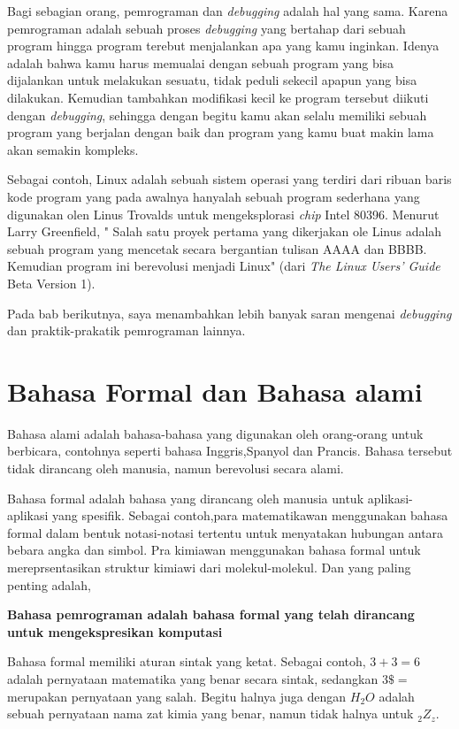 Bagi sebagian orang, pemrograman dan \textit{debugging} adalah hal yang sama. Karena pemrograman adalah sebuah proses \textit{debugging} yang bertahap dari sebuah program hingga program terebut menjalankan apa yang kamu inginkan. Idenya adalah bahwa kamu harus memualai dengan sebuah program yang bisa dijalankan untuk melakukan sesuatu, tidak peduli sekecil apapun yang bisa dilakukan. Kemudian tambahkan modifikasi kecil ke program tersebut diikuti dengan \textit{debugging}, sehingga dengan begitu kamu akan selalu memiliki sebuah program yang berjalan dengan baik dan program yang kamu buat makin lama akan semakin kompleks.

Sebagai contoh, Linux adalah sebuah sistem operasi yang terdiri dari ribuan baris kode program yang pada awalnya hanyalah sebuah program sederhana yang digunakan olen Linus Trovalds untuk mengeksplorasi \textit{chip} Intel 80396. Menurut Larry Greenfield, " Salah satu proyek pertama yang dikerjakan ole Linus adalah sebuah program yang mencetak secara bergantian tulisan AAAA dan BBBB. Kemudian program ini berevolusi menjadi Linux" (dari \textit{The Linux Users' Guide} Beta Version 1).

Pada bab berikutnya, saya menambahkan lebih banyak saran mengenai \textit{debugging} dan praktik-prakatik pemrograman lainnya.


\section{Bahasa Formal dan Bahasa alami}

Bahasa alami adalah bahasa-bahasa yang digunakan oleh orang-orang untuk berbicara, contohnya seperti bahasa Inggris,Spanyol dan Prancis. Bahasa tersebut tidak dirancang oleh manusia, namun berevolusi secara alami.

Bahasa formal adalah bahasa yang dirancang oleh manusia untuk aplikasi-aplikasi yang spesifik. Sebagai contoh,para matematikawan menggunakan bahasa formal dalam bentuk notasi-notasi tertentu untuk menyatakan hubungan antara bebara angka dan simbol. Pra kimiawan menggunakan bahasa formal untuk mereprsentasikan struktur kimiawi dari molekul-molekul. Dan yang paling penting adalah, 

\textbf{Bahasa pemrograman adalah bahasa formal yang telah dirancang untuk mengekspresikan komputasi}

Bahasa formal memiliki aturan sintak yang ketat. Sebagai contoh, $3+3=6$ adalah pernyataan matematika yang benar secara sintak, sedangkan $ 3\$=$ merupakan pernyataan yang salah. Begitu halnya juga dengan $H_{2}O$ adalah sebuah pernyataan nama zat kimia yang benar, namun tidak halnya untuk $_{2}Z_{z}$.

